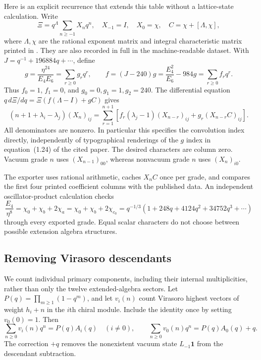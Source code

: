 \documentclass[11pt,a4paper]{article}
\theoremstyle{definition}
\begin{document}
Here is an explicit recurrence that extends this table without a
lattice-state calculation.  Write
\[
 \Xi=q^\Lambda\sum_{n\geq-1}X_nq^n,
 \quad X_{-1}=I,\quad X_0=\chi,
 \quad C=\chi+[\Lambda,\chi],
\]
where $\Lambda,\chi$ are the rational exponent matrix and integral
characteristic matrix printed in \cite[Section~2.4]{EG}.  They are
also recorded in full in the machine-readable dataset.  With
$J=q^{-1}+196884q+\cdots$, define
\[
 g=\frac{\eta^{24}}{E_4E_6}=\sum_{r\geq0}g_rq^r,
 \qquad
 f=(J-240)g
   =\frac{E_4^2}{E_6}-984g=\sum_{r\geq0}f_rq^r.
\]
Thus $f_0=1$, $f_1=0$, and $g_0=0,g_1=1,g_2=240$.
The differential equation $q\,d\Xi/dq=\Xi(f(\Lambda-I)+gC)$ gives
\begin{equation}\label{eq:physics-xi-recurrence}
 (n+1+\lambda_i-\lambda_j)(X_n)_{ij}
 =\sum_{r=1}^{n+1}
 \left[f_r(\lambda_j-1)(X_{n-r})_{ij}
       +g_r(X_{n-r}C)_{ij}\right].
\end{equation}
All denominators are nonzero.  In particular this specifies the
convolution index directly, independently of typographical renderings
of the $g$ index in equation~(1.24) of the cited paper.  The desired
characters are column zero.  Vacuum grade $n$ uses $(X_{n-1})_{00}$,
whereas nonvacuum grade $n$ uses $(X_n)_{i0}$.

The exporter uses rational arithmetic, caches $X_nC$ once per grade,
and compares the first four printed coefficient columns with the
published data.  An independent oscillator-product calculation checks
\begin{equation}\label{eq:physics-e8-character-identity}
 \frac{E_4}{\eta^8}
 =\chi_0+\chi_b+2\chi_a
 =\chi_0+\chi_b+2\chi_{c_0}
 =q^{-1/3}(1+248q+4124q^2+34752q^3+\cdots)
\end{equation}
through every exported grade.  Equal scalar characters do not choose
between possible extension algebra structures.

\subsection{Removing Virasoro descendants}

We count individual primary components, including their internal
multiplicities, rather than only the twelve extended-algebra sectors.
Let $P(q)=\prod_{m\geq1}(1-q^m)$, and let $v_i(n)$ count Virasoro
highest vectors of weight $h_i+n$ in the $i$th chiral module.  Include
the identity once by setting $v_0(0)=1$.  Then
\begin{equation}\label{eq:physics-primary-extraction}
 \sum_{n\geq0}v_i(n)q^n=P(q)A_i(q)\quad(i\ne0),
 \qquad
 \sum_{n\geq0}v_0(n)q^n=P(q)A_0(q)+q.
\end{equation}
The correction $+q$ removes the nonexistent vacuum state
$L_{-1}\mathbf1$ from the descendant subtraction.
\end{document}
